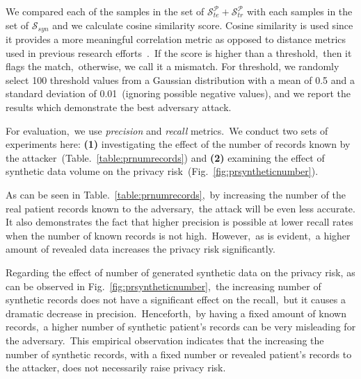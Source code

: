 \documentclass[letterpaper]{article} \usepackage{aaai20}  \usepackage{times}  \usepackage{helvet} \usepackage{courier}  \usepackage[hyphens]{url}  \usepackage{graphicx} \urlstyle{rm} \def\UrlFont{\rm}  \usepackage{graphicx}  \frenchspacing  \setlength{\pdfpagewidth}{8.5in}  \setlength{\pdfpageheight}{11in}
\begin{document}
We compared each of the samples in the set of $\mathcal{S}^{\mathcal{P}}_{te}+\mathcal{S}^{\mathcal{P}}_{tr}$ with each samples in the set of $\mathcal{S}_{syn}$ and we calculate cosine similarity score. Cosine similarity is used since it provides a more meaningful correlation metric as opposed to distance metrics~\cite{mateo2004outlier} used in previous research efforts~\cite{choi2017generating}.~If the score is higher than a threshold,~then it flags the match,~otherwise, we call it a mismatch. For threshold, we randomly select 100 threshold values from a Gaussian distribution with a mean of 0.5 and a standard deviation of 0.01~(ignoring possible negative values), and we report the results which demonstrate the best adversary attack.

For evaluation,~we use \textit{precision} and \textit{recall} metrics.~We conduct two sets of experiments here: \textbf{(1)} investigating the effect of the number of records known by the attacker~(Table.~\ref{table:prnumrecords}) and \textbf{(2)} examining the effect of synthetic data volume on the privacy risk~(Fig.~\ref{fig:prsyntheticnumber}).





As can be seen in Table.~\ref{table:prnumrecords},~by increasing the number of the real patient records known to the adversary,~the attack will be even less accurate. It also demonstrates the fact that higher precision is possible at lower recall rates when the number of known records is not high.~However,~as is evident,~a higher amount of revealed data increases the privacy risk significantly. 

Regarding the effect of number of generated synthetic data on the privacy risk, as can be observed in Fig.~\ref{fig:prsyntheticnumber},~the increasing number of synthetic records does not have a significant effect on the recall,~but it causes a dramatic decrease in precision.~Henceforth,~by having a fixed amount of known records,~a higher number of synthetic patient's records can be very misleading for the adversary.~This empirical observation indicates that the increasing the number of synthetic records, with a fixed number or revealed patient's records to the attacker, does not necessarily raise privacy risk.


\begin{table}[t]
\caption{The precision and recall demonstrated as a function of the number of patients whose data is revealed to the attacker. $\mathcal{U}$ = \# of Known Records to the attacker.}\smallskip
\centering
{}
\label{table:prnumrecords}
\end{table}
\end{document}
